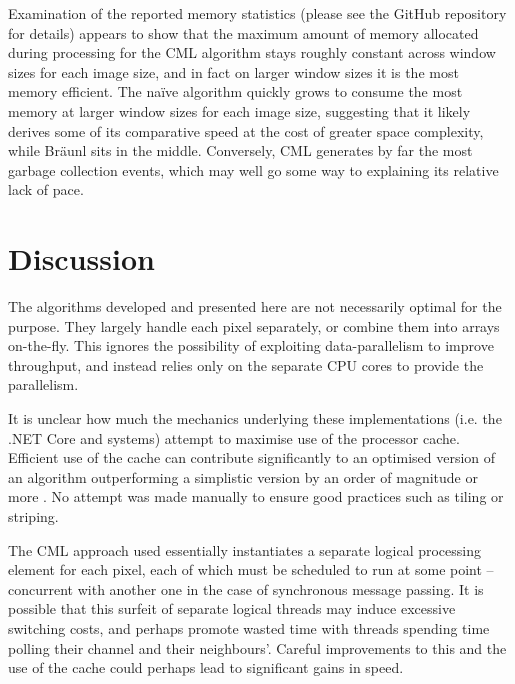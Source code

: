Examination of the reported memory statistics (please see the GitHub repository for details) appears to show that the maximum amount of memory allocated during processing for the CML algorithm stays roughly constant across window sizes for each image size, and in fact on larger window sizes it is the most memory efficient.  The naïve algorithm quickly grows to consume the most memory at larger window sizes for each image size, suggesting that it likely derives some of its comparative speed at the cost of greater space complexity, while Bräunl sits in the middle.  Conversely, CML generates by far the most garbage collection events, which may well go some way to explaining its relative lack of pace.

\section{Discussion}

The algorithms developed and presented here are not necessarily optimal for the purpose.  They largely handle each pixel separately, or combine them into arrays on-the-fly.  This ignores the possibility of exploiting data-parallelism to improve throughput, and instead relies only on the separate CPU cores to provide the parallelism.  %


It is unclear how much the mechanics underlying these implementations (i.e. the .NET Core and \hopac{} systems) attempt to maximise use of the processor cache.  Efficient use of the cache can contribute significantly to an optimised version of an algorithm outperforming a simplistic version by an order of magnitude or more \cite{Ragan-Kelley2017}.  No attempt was made manually to ensure good practices such as tiling or striping.  %

The CML approach used essentially instantiates a separate logical processing element for each pixel, each of which must be scheduled to run at some point -- concurrent with another one in the case of synchronous message passing.  It is possible that this surfeit of separate logical threads may induce excessive switching costs, and perhaps promote wasted time with threads spending time polling their channel and their neighbours'.  Careful improvements to this and the use of the cache could perhaps lead to significant gains in speed.

